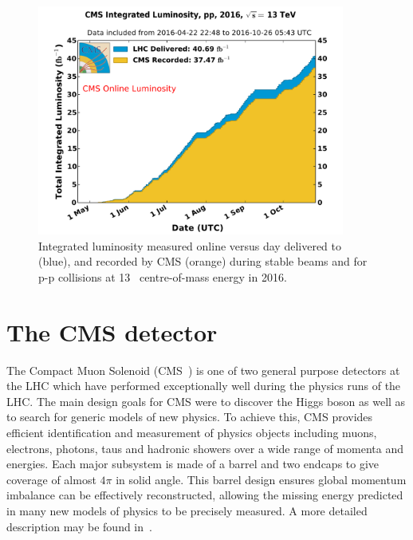 \begin{figure}
\centering
    \includegraphics[width=0.9\textwidth]{./Figures/detector/int_lumi_per_day_cumulative_pp_2016OnlineLumi}
  \caption{Integrated luminosity measured online versus day delivered to (blue), 
  and recorded by CMS (orange) during stable beams and for p-p collisions at 13\TeV~ centre-of-mass energy in 2016.}
  \label{fig:LHC-integrated-lumi}
\end{figure}

\section{The CMS detector}
The Compact Muon Solenoid (CMS~\cite{CMS}) is one of two general purpose detectors at the LHC 
which have performed exceptionally well during the physics runs of the LHC. The main design goals
for CMS were to discover the Higgs boson as well as to search for generic models 
of new physics. To achieve this, CMS provides efficient identification and measurement
of physics objects including muons, electrons, photons, taus and hadronic showers over a
wide range of momenta and energies. Each major subsystem is made of a barrel
and two endcaps to give coverage of almost $4\pi$ in solid angle. 
This barrel design ensures global momentum imbalance can be effectively 
reconstructed, allowing the missing energy predicted in many new models of physics to be
precisely measured. A more detailed description may be found in~\cite{CMS}.  

